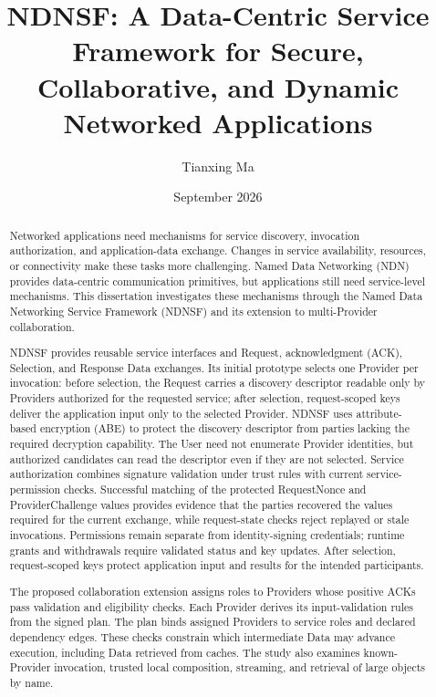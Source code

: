 \documentclass[
    doctoral,
    proposal,
    showabstract,
    secnum,
    nohyphenation,
    pdfonly,
    noboundcover
]{uofm}
\title{NDNSF: A Data-Centric Service Framework for Secure, Collaborative, and Dynamic Networked Applications}
\author{Tianxing Ma}
\date{September 2026}
\begin{document}
\hypersetup{pageanchor=false}
\maketitle

\frontmatter
\hypersetup{pageanchor=true}

\begin{abstract}
Networked applications need mechanisms for service discovery, invocation authorization, and application-data exchange. Changes in service availability, resources, or connectivity make these tasks more challenging. Named Data Networking (NDN) provides data-centric communication primitives, but applications still need service-level mechanisms. This dissertation investigates these mechanisms through the Named Data Networking Service Framework (NDNSF) and its extension to multi-Provider collaboration.

NDNSF provides reusable service interfaces and Request, acknowledgment (ACK), Selection, and Response Data exchanges. Its initial prototype selects one Provider per invocation: before selection, the Request carries a discovery descriptor readable only by Providers authorized for the requested service; after selection, request-scoped keys deliver the application input only to the selected Provider. NDNSF uses attribute-based encryption (ABE) to protect the discovery descriptor from parties lacking the required decryption capability. The User need not enumerate Provider identities, but authorized candidates can read the descriptor even if they are not selected. Service authorization combines signature validation under trust rules with current service-permission checks. Successful matching of the protected RequestNonce and ProviderChallenge values provides evidence that the parties recovered the values required for the current exchange, while request-state checks reject replayed or stale invocations. Permissions remain separate from identity-signing credentials; runtime grants and withdrawals require validated status and key updates. After selection, request-scoped keys protect application input and results for the intended participants.

The proposed collaboration extension assigns roles to Providers whose positive ACKs pass validation and eligibility checks. Each Provider derives its input-validation rules from the signed plan. The plan binds assigned Providers to service roles and declared dependency edges. These checks constrain which intermediate Data may advance execution, including Data retrieved from caches. The study also examines known-Provider invocation, trusted local composition, streaming, and retrieval of large objects by name.


\end{abstract}
\end{document}
